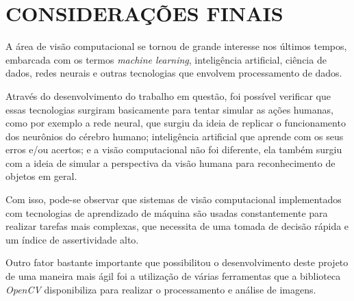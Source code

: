 \chapter{\textbf{CONSIDERAÇÕES FINAIS}}
\label{consideracoes_finais}

A área de visão computacional se tornou de grande interesse nos últimos tempos, embarcada com os termos \textit{machine learning}, inteligência artificial, ciência de dados, redes neurais e outras tecnologias que envolvem processamento de dados.

Através do desenvolvimento do trabalho em questão, foi possível verificar que essas tecnologias surgiram basicamente para tentar simular as ações humanas, como por exemplo a rede neural, que surgiu da ideia de replicar o funcionamento dos neurônios do cérebro humano; inteligência artificial que aprende com os seus erros e/ou acertos; e a visão computacional não foi diferente, ela também surgiu com a ideia de simular a perspectiva da visão humana para reconhecimento de objetos em geral.

Com isso, pode-se observar que sistemas de visão computacional implementados com tecnologias de aprendizado de máquina são usadas constantemente para realizar tarefas mais complexas, que necessita de uma tomada de decisão rápida e um índice de assertividade alto.



Outro fator bastante importante que possibilitou o desenvolvimento deste projeto de uma maneira mais ágil foi a utilização de várias ferramentas que a biblioteca \textit{OpenCV} disponibiliza para realizar o processamento e análise de imagens.



